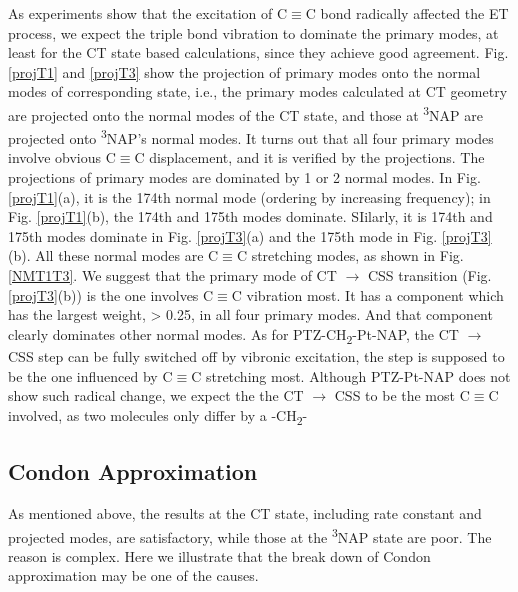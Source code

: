 As experiments show that the excitation of C$\equiv$C bond radically affected the ET process, we expect the triple bond vibration to dominate the primary modes, at least for the CT state based calculations, since they achieve good agreement. Fig. \ref{projT1} and \ref{projT3} show the projection of primary modes onto the normal modes of corresponding state, i.e., the primary modes calculated at CT geometry are projected onto the normal modes of the CT state, and those at \textsuperscript{3}NAP are projected onto \textsuperscript{3}NAP's normal modes. It turns out that all four primary modes involve obvious C$\equiv$C displacement, and it is verified by the projections. The projections of primary modes are dominated by 1 or 2 normal modes. In Fig. \ref{projT1}(a), it is the 174th normal mode (ordering by increasing frequency); in Fig. \ref{projT1}(b), the 174th and 175th modes dominate. SIilarly, it is 174th and 175th modes dominate in Fig. \ref{projT3}(a) and the 175th mode in Fig. \ref{projT3}(b). All these normal modes are C$\equiv$C stretching modes, as shown in Fig. \ref{NMT1T3}. We suggest that the primary mode of  CT $\rightarrow$ CSS transition (Fig. \ref{projT3}(b)) is the one involves C$\equiv$C vibration most. It has a component which has the largest weight, > 0.25, in all four primary modes. And that component clearly dominates other normal modes. As for PTZ-CH\textsubscript{2}-Pt-NAP, the CT $\rightarrow$ CSS step can be fully switched off by vibronic excitation, the step is supposed to be the one influenced by C$\equiv$C stretching most. Although PTZ-Pt-NAP does not show such radical change, we expect the the CT $\rightarrow$ CSS to be the most C$\equiv$C involved, as two molecules only differ by a -CH\textsubscript{2}-






\subsection{Condon Approximation}

As mentioned above, the results at the CT state, including rate constant and projected modes, are satisfactory, while those at the \textsuperscript{3}NAP state are poor. The reason is complex. Here we illustrate that the break down of Condon approximation may be one of the causes.


